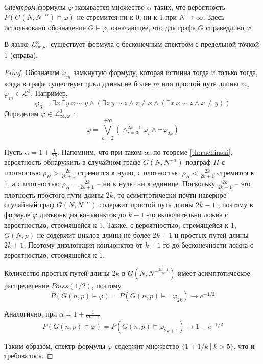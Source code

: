 
\Def \textit{Спектром} формулы $\varphi$ называется множество $\alpha$ таких, что вероятность $P\left( G\left(N, N^{-\alpha}\right) \vDash \varphi  \right)$ не стремится ни к 0, ни к 1 при $N \rightarrow \infty$.
Здесь использовано обозначение $G \vDash \varphi$, означающее, что для графа $G$ справедливо $\varphi$.

\begin{theorem}
В языке $\mathcal{L}^3_{\infty, \omega}$ существует формула с бесконечным спектром с предельной точкой 1 (справа).
\end{theorem}
\begin{proof}
Обозначим $\varphi_m$ замкнутую формулу, которая истинна тогда и только тогда, когда в графе существует цикл длины не более $m$  или простой путь длины $m$,  $\varphi_m \in \mathcal{L}^3$. Например,
\[
\varphi_3 = \exists x ~\exists y ~
 x \sim y  \wedge \left( \exists z ~ y \sim z \wedge  z \neq x 
\wedge \left(\exists x ~ x \sim z \wedge x \neq y
\right) \right) 
\]
Определим $\varphi \in \mathcal{L}^3_{\infty, \omega}$ :
\[
\varphi = \bigvee_{k = 2}^{+\infty}\left(
\wedge_{i=3}^{2k-1} \varphi_{i}  \wedge \neg \varphi_{2k} \right)
\]

Пусть $\alpha = 1 + \frac{1}{2k}$.
Напомним, что при таком $\alpha$, по теореме \ref{th:ruchinski}, вероятность обнаружить в случайном графе $G(N, N^{-\alpha})$ подграф $H$ с плотностью $\rho_H > \frac{2k}{2k+1}$ стремится к нулю, с плотностью $\rho_H < \frac{2k}{2k+1}$ стремится к 1, а с плотностью $\rho_H = \frac{2k}{2k+1}$ -- ни к нулю ни к единице.
Поскольку $\frac{2k}{2k+1}$ -- это плотность простого пути длины $2k$, то асимптотически почти наверное случайный граф $G(N, N^{-\alpha})$ содержит простой путь длины $2k-1$ , поэтому в формуле $\varphi$ дизъюнкция конъюнктов до $k-1$ -го включительно ложна с вероятностью, стремящейся к 1.
Также, с вероятностью, стремящейся к 1, $G(N, p)$ не содержит циклов длины не более $2k+1$ и простых путей длины $2k+1$.
Поэтому дизъюнкция конъюнктов от $k+1$-го до бесконечности ложна с вероятностью, стремящейся к 1.

Количество простых путей длины $2k$ в $G(N, N^{-\frac{2k+1}{2k}})$ имеет асимптотическое распределение $Poiss(1/2)$, поэтому
$$
P(G(n, p) \models \varphi) = 
P(G(n, p) \models \neg \varphi_{2k}) \rightarrow e^{-1/2}
$$

Аналогично, при $\alpha = 1 + \frac{1}{2k+1}$ 
$$P(G(n, p) \models \varphi) = 
P\left(G\left(n, p \right) \models  \varphi_{2k+1}\right) \rightarrow 1 - e^{-1/2}$$

Таким образом, спектр формулы $\varphi$ содержит множество $\{1 + 1/k ~|~ k > 5 \}$, что и требовалось.
\end{proof}